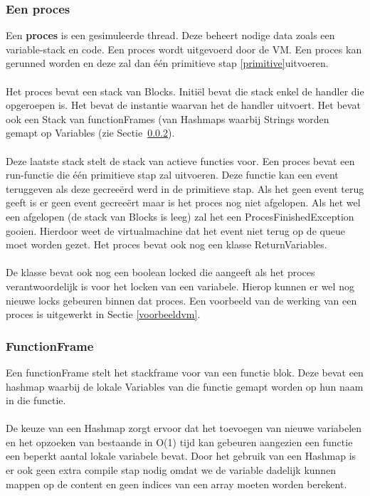 \documentclass[]{article}
\begin{document}
\subsubsection{Een proces}
Een \textbf{proces} is een gesimuleerde thread. Deze beheert nodige data zoals een variable-stack en code. Een proces wordt uitgevoerd door de VM. Een proces kan gerunned worden en deze zal dan \'{e}\'{e}n primitieve stap \ref{primitive}uitvoeren.\\\\
Het proces bevat een stack van Blocks. Initi\"{e}l bevat die stack enkel de handler die opgeroepen is. Het bevat de instantie waarvan het de handler uitvoert. Het bevat ook een Stack van functionFrames (van Hashmaps waarbij Strings worden gemapt op Variables (zie Sectie~\ref{functionframe}).\\\\ Deze laatste stack stelt de stack van actieve functies voor. Een proces bevat een run-functie die \'{e}\'{e}n primitieve stap zal uitvoeren. Deze functie kan een event teruggeven als deze gecree\"{e}rd werd in de primitieve stap. Als het geen event terug geeft is er geen event gecree\"{e}rt maar is het proces nog niet afgelopen. Als het wel een afgelopen (de stack van Blocks is leeg) zal het een ProcesFinishedException gooien. Hierdoor weet de virtualmachine dat het event niet terug op de queue moet worden gezet. Het proces bevat ook nog een klasse ReturnVariables.\\\\ De klasse bevat ook nog een boolean locked die aangeeft als het proces verantwoordelijk is voor het locken van een variabele. Hierop kunnen er wel nog nieuwe locks gebeuren binnen dat proces. Een voorbeeld van de werking van een proces is uitgewerkt in Sectie \ref{voorbeeldvm}.

\subsubsection{FunctionFrame}
\label{functionframe}
Een functionFrame stelt het stackframe voor van een functie blok. Deze bevat een hashmap \cite{hashmap} waarbij
de lokale Variables van die functie gemapt worden op hun naam in die functie.\\\\
De keuze van een Hashmap zorgt ervoor dat het toevoegen van nieuwe variabelen en het opzoeken van bestaande in O(1) tijd kan gebeuren aangezien een functie een beperkt aantal lokale variabele bevat. Door het gebruik van een Hashmap is er ook geen extra compile stap nodig omdat we de variable dadelijk kunnen mappen op de content en geen indices van een array moeten worden berekent.\cite{hashmap}
\end{document}

